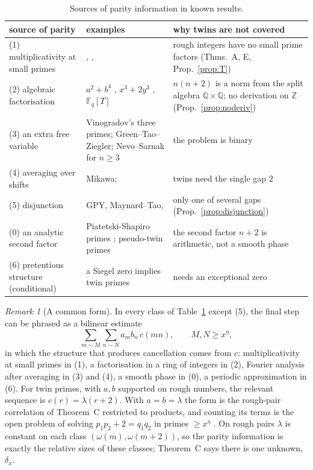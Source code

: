 \documentclass[11pt]{amsart}
\theoremstyle{definition}
\theoremstyle{remark}
\newtheorem{remark}[theorem]{Remark}
\newcommand{\Z}{\mathbb{Z}}
\begin{document}
\begin{table}[h]
\centering
\small
\begin{tabular}{p{3.1cm}p{5.3cm}p{4.6cm}}
\toprule
source of parity & examples & why twins are not covered\\
\midrule
(1) multiplicativity at small primes & \cite{Tao16,HR21,Pil23,Ter18,MR16}, \cite{LWW26}, \cite{OpenAI26} & rough integers have no small prime factors (Thms.~A, E, Prop.~\ref{prop:T})\\
(2) algebraic factorisation & $a^2+b^4$ \cite{FI98}, $x^3+2y^3$ \cite{HB01}, $\mathbb F_q[T]$ \cite{SS22} & $n(n+2)$ is a norm from the split algebra $\mathbb Q\times\mathbb Q$; no derivation on $\Z$ (Prop.~\ref{prop:noderiv})\\
(3) an extra free variable & Vinogradov's three primes; Green--Tao--Ziegler; Nevo--Sarnak for $n\ge3$ \cite{NS10} & the problem is binary\\
(4) averaging over shifts & Mikawa; \cite{MRT19} & twins need the single gap $2$\\
(5) disjunction & GPY, Maynard--Tao, \cite{Polymath8b} & only one of several gaps (Prop.~\ref{prop:disjunction})\\
\midrule
(0) an analytic second factor & Piatetski-Shapiro primes \cite{PS53}; pseudo-twin primes \cite{Kon05} & the second factor $n+2$ is arithmetic, not a smooth phase\\
(6) pretentious structure (conditional) & a Siegel zero implies twin primes \cite{HB83,TT21,MM23} & needs an exceptional zero\\
\bottomrule
\end{tabular}
\caption{Sources of parity information in known results.}
\label{tab:census}
\end{table}

\begin{remark}[A common form]\label{rem:bilinear}
In every class of Table~\ref{tab:census} except (5), the final step can be phrased as a bilinear estimate
\[
\sum_{m\sim M}\sum_{n\sim N}a_mb_n\,c(mn),\qquad M,N\ge x^{\eta},
\]
in which the structure that produces cancellation comes from $c$: multiplicativity at small primes in (1), a factorisation in a ring of integers in (2), Fourier analysis after averaging in (3) and (4), a smooth phase in (0), a periodic approximation in (6). For twin primes, with $a,b$ supported on rough numbers, the relevant sequence is $c(r)=\lambda(r+2)$. With $a=b=\lambda$ the form is the rough-pair correlation of Theorem~C restricted to products, and counting its terms is the open problem of solving $p_1p_2+2=q_1q_2$ in primes $\ge x^\eta$ \cite[Rem.~1.5(2)]{NS10}. On rough pairs $\lambda$ is constant on each class $(\omega(m),\omega(m+2))$, so the parity information is exactly the relative sizes of these classes; Theorem~C says there is one unknown, $\delta_x$.
\end{remark}
\end{document}
